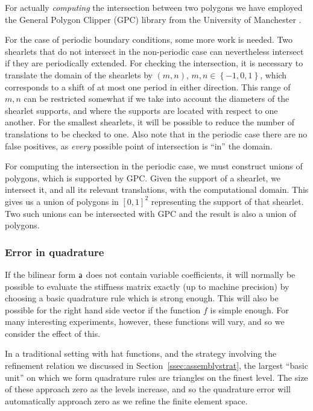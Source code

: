 For actually {\em computing} the intersection between two polygons we have employed the General Polygon
Clipper (GPC) library from the University of Manchester \cite{Murta2012}.

For the case of periodic boundary conditions, some more work is needed. Two shearlets that do not intersect in
the non-periodic case can nevertheless intersect if they are periodically extended. For checking the
intersection, it is necessary to translate the domain of the shearlets by $(m,n)$,
$m,n\in\left\{-1,0,1\right\}$, which corresponds to a shift of at most one period in either direction. This
range of $m,n$ can be restricted somewhat if we take into account the diameters of the shearlet supports, and
where the supports are located with respect to one another. For the smallest shearlets, it will be possible to
reduce the number of translations to be checked to one. Also note that in the periodic case there are no false
positives, as {\em every} possible point of intersection is ``in'' the domain.

For computing the intersection in the periodic case, we must construct unions of polygons, which is supported
by GPC.  Given the support of a shearlet, we intersect it, and all its relevant translations, with the
computational domain. This gives us a union of polygons in $[0,1]^2$ representing the support of that
shearlet. Two such unions can be intersected with GPC and the result is also a union of polygons.

\subsubsection{Error in quadrature} \label{sec:error-in-quadrature}

If the bilinear form ${\sf a}$ does not contain variable coefficients, it will normally be possible to evaluate
the stiffness matrix exactly (up to machine precision) by choosing a basic quadrature rule which is strong
enough. This will also be possible for the right hand side vector if the function $f$ is simple enough. For
many interesting experiments, however, these functions will vary, and so we consider the effect of this.

In a traditional setting with hat functions, and the strategy involving the refinement relation we discussed
in Section~\ref{ssec:assemblystrat}, the largest ``basic unit'' on which we form quadrature rules are
triangles on the finest level. The size of these approach zero as the levels increase, and so the quadrature
error will automatically approach zero as we refine the finite element space.

